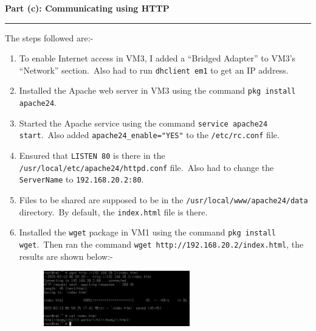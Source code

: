\documentclass[a4paper,12pt]{article}
\newenvironment{solution}[2][]{%
\begin{mdframed}[linecolor=blue!70!black, linewidth=2pt, roundcorner=10pt, backgroundcolor=yellow!10!white, skipabove=12pt, skipbelow=12pt]%
	\textbf{\large #2}
	\par\noindent\rule{\textwidth}{0.4pt}
}{
\end{mdframed}
}
\begin{document}
\begin{solution}{Part (c): Communicating using HTTP}
    The steps followed are:-
    \begin{enumerate}
        \item To enable Internet access in VM3, I added a ``Bridged Adapter'' to VM3's ``Network'' section.\ Also had to run \texttt{dhclient em1} to get an IP address.
        \item Installed the Apache web server in VM3 using the command \texttt{pkg install apache24}.
        \item Started the Apache service using the command \texttt{service apache24 start}.\ Also added \texttt{apache24\_enable="YES"} to the \texttt{/etc/rc.conf} file.
        \item Ensured that \texttt{LISTEN 80} is there in the \texttt{/usr/local/etc/apache24/httpd.conf} file.\ Also had to change the \texttt{ServerName} to \texttt{192.168.20.2:80}.
        \item Files to be shared are supposed to be in the \texttt{/usr/local/www/apache24/data} directory.\ By default, the \texttt{index.html} file is there.
        \item Installed the \texttt{wget} package in VM1 using the command \texttt{pkg install wget}.\ Then ran the command \texttt{wget http://192.168.20.2/index.html}, the results are shown below:-
        \begin{figure}[H]
            \centering
            \includegraphics[width=0.6\textwidth]{wget.png}
        \end{figure}
    \end{enumerate}
\end{solution}
\end{document}
